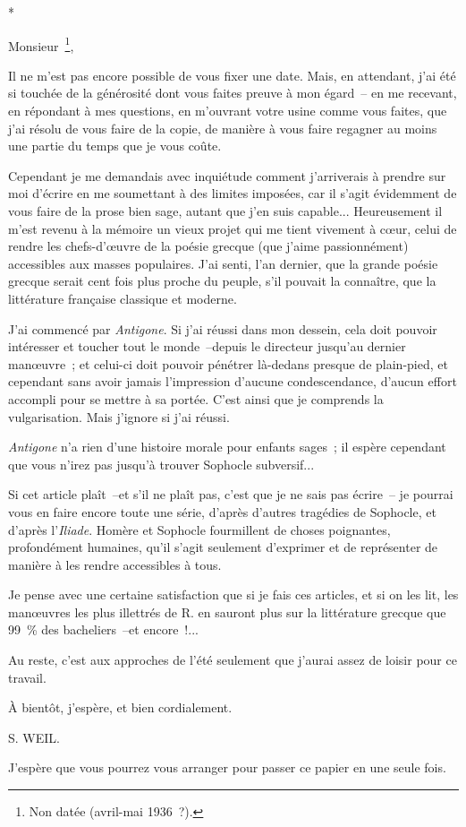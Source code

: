 \documentclass[french,twoside]{book} %
\begin{document}
\begin{center}
*\end{center}
\noindent Monsieur \footnote{Non datée (avril-mai 1936 ?).},\par
Il ne m'est pas encore possible de vous fixer une date. Mais, en attendant, j'ai été si touchée de la générosité dont vous faites preuve à mon égard – en me recevant, en répondant à mes questions, en m'ouvrant votre usine comme vous faites, que j'ai résolu de vous faire de la copie, de manière à vous faire regagner au moins une partie du temps que je vous coûte.\par
Cependant je me demandais avec inquiétude comment j'arriverais à prendre sur moi d'écrire en me soumettant à des limites imposées, car il s'agit évidemment de vous faire de la prose bien sage, autant que j'en suis capable... Heureusement il m'est revenu à la mémoire un vieux projet qui me tient vivement à cœur, celui de rendre les chefs-d'œuvre de la poésie grecque (que j'aime passionnément) accessibles aux masses populaires. J'ai senti, l'an dernier, que la grande poésie grecque serait cent fois plus proche du peuple, s'il pouvait la connaître, que la littérature française classique et moderne.\par
J'ai commencé par {\itshape Antigone}. Si j'ai réussi dans mon dessein, cela doit pouvoir intéresser et toucher tout le monde –depuis le directeur jusqu'au dernier manœuvre ; et celui-ci doit pouvoir pénétrer là-dedans presque de plain-pied, et cependant sans avoir jamais l'impression d'aucune condescendance, d'aucun effort accompli pour se mettre à sa portée. C'est ainsi que je comprends la vulgarisation. Mais j'ignore si j'ai réussi.\par
{\itshape Antigone} n'a rien d'une histoire morale pour enfants sages ; il espère cependant que vous n'irez pas jusqu'à trouver Sophocle subversif...\par
Si cet article plaît –et s'il ne plaît pas, c'est que je ne sais pas écrire – je pourrai vous en faire encore toute une série, d'après d'autres tragédies de Sophocle, et d'après l'{\itshape Iliade}. Homère et Sophocle fourmillent de choses poignantes, profondément humaines, qu'il s'agit seulement d'exprimer et de représenter de manière à les rendre accessibles à tous.\par
Je pense avec une certaine satisfaction que si je fais ces articles, et si on les lit, les manœuvres les plus illettrés de R. en sauront plus sur la littérature grecque que 99 \% des bacheliers –et encore !...\par
Au reste, c'est aux approches de l'été seulement que j'aurai assez de loisir pour ce travail.\par
À bientôt, j'espère, et bien cordialement.\par
S. WEIL.\par
J'espère que vous pourrez vous arranger pour passer ce papier en une seule fois.\par
\end{document}
